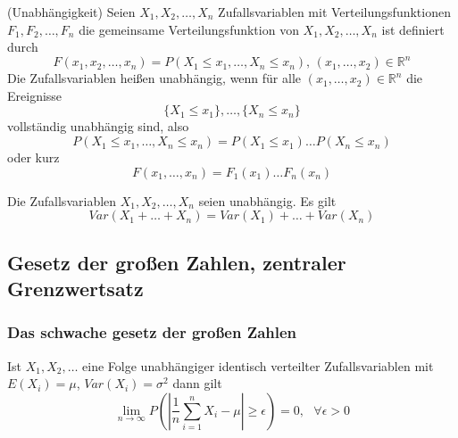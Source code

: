 \documentclass[
	ngerman,
	accentcolor=9c,%
	type=intern,
	marginpar=false
	]{tudapub}
\begin{document}
                \setcounter{satz}{2}
                \begin{definition}(Unabhängigkeit)
                    Seien $X_1,X_2,\dots,X_n$ Zufallsvariablen mit Verteilungsfunktionen $F_1,F_2,\dots,F_n$
                    die gemeinsame Verteilungsfunktion von $X_1,X_2,\dots,X_n$ ist definiert durch 
                    \begin{equation*}
                        F(x_1,x_2,\dots,x_n) = P(X_1 \leq x_1, \dots, X_n \leq x_n)\mbox{, }(x_1,\dots,x_2) \in \mathbb{R}^n
                    \end{equation*}
                    Die Zufallsvariablen heißen unabhängig, wenn für alle $(x_1,\dots,x_2) \in \mathbb{R}^n$ die Ereignisse
                    \begin{equation*}
                        \{X_1 \leq x_1\}, \dots, \{X_n \leq x_n\}
                    \end{equation*}
                    vollständig unabhängig sind, also
                    \begin{equation*}
                        P(X_1 \leq x_1, \dots, X_n \leq x_n) = P(X_1 \leq x_1)\dots P(X_n \leq x_n)
                    \end{equation*}
                    oder kurz
                    \begin{equation*}
                        F(x_1, \dots, x_n) = F_1(x_1)\dots F_n(x_n)
                    \end{equation*}
                \end{definition}
                \begin{satz}
                    Die Zufallsvariablen $X_1,X_2,\dots,X_n$ seien unabhängig. Es gilt
                    \begin{equation*}
                        Var(X_1+\dots+X_n) = Var(X_1) + \dots + Var(X_n)
                    \end{equation*}
                \end{satz}
        \subsection{Gesetz der großen Zahlen, zentraler Grenzwertsatz}
            \subsubsection{Das schwache gesetz der großen Zahlen}
                \begin{satz}
                    Ist $X_1,X_2,\dots$ eine Folge unabhängiger identisch verteilter Zufallsvariablen mit $E(X_i)=\mu$, $Var(X_i)=\sigma^2$ dann gilt
                    \begin{equation*}
                        \lim_{n\rightarrow \infty}P\left(
                            \left|\dfrac{1}{n}\sum_{i=1}^n X_i - \mu \right| \geq \epsilon
                        \right)
                        = 0,\mbox{ } \forall \epsilon > 0
                    \end{equation*}
                \end{satz}
\end{document}
